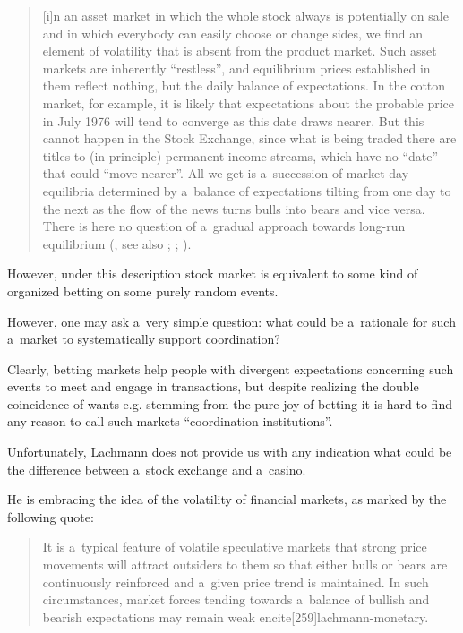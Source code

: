 {\begin{quote}
[i]n an asset market in which the whole stock always is potentially on sale and in which everybody can easily choose or change sides, we find an element of volatility that is absent from the product market. Such asset markets are inherently ``restless'', and equilibrium prices established in them reflect nothing, but the daily balance of expectations. In the cotton market, for example, it is likely that expectations about the probable price in July 1976 will tend to converge as this date draws nearer. But this cannot happen in the Stock Exchange, since what is being traded there are titles to (in principle) permanent income streams, which have no ``date'' that could ``move nearer''. All we get is a~succession of market-day equilibria determined by a~balance of expectations tilting from one day to the next as the flow of the news turns bulls into bears and vice versa. There is here no question of a~gradual approach towards long-run equilibrium (\cite[60]{lachmann-kaleidic}, see also \cite[202]{lachmann-hayek}; \citeyear[161--162]{lachmann-individualism}; \citeyear[264]{lachmann-speculative-markets}).

\end{quote}



However, under this description stock market is equivalent to some kind of organized betting on some purely random events.

However, one may ask a~very simple question: what could be a~rationale for such a~market to systematically support coordination?

Clearly, betting markets help people with divergent expectations concerning such events to meet and engage in transactions, but despite realizing the double coincidence of wants e.g. stemming from the pure joy of betting it is hard to find any reason to call such markets ``coordination institutions''.

Unfortunately, Lachmann does not provide us with any indication what could be the difference between a~stock exchange and a~casino.

He is embracing the idea of the volatility of financial markets, as marked by the following quote:

\begin{quote}

It is a~typical feature of volatile speculative markets that strong price movements will attract outsiders to them so that either bulls or bears are continuously reinforced and a~given price trend is maintained. In such circumstances, market forces tending towards a~balance of bullish and bearish expectations may remain weak encite[259]{lachmann-monetary}.


\end{quote}}
